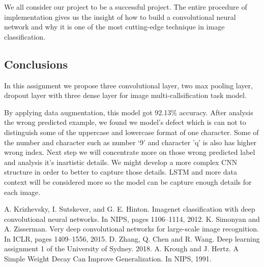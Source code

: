 \documentclass[twoside,twocolumn,10.8pt]{article}
\begin{document}
\noindent We all consider our project to be a successful project. The entire procedure of implementation gives us the insight of how to build a convolutional neural network and why it is one of the most cutting-edge technique in image classification.

\subsection{Conclusions}
\noindent In this assignment we propose three convolutional layer, two max pooling layer, dropout layer with three dense layer for image multi-callsification task model.

\noindent By applying data augmentation, this model got 92.13\% accuracy. After analysis the wrong predicted example, we found we model’s defect which is can not to distinguish some of the uppercase and lowercase format of one character. Some of the number and character such as number ‘9’ and character ’q’ is also has higher wrong index. Next step we will concentrate more on those wrong predicted label and analysis it’s inartistic details. We might develop a more complex CNN structure in order to better to capture those details. LSTM and more data context will be considered more so the model can be capture enough details for each image.













\begin{thebibliography}{99} %

A. Krizhevsky, I. Sutskever, and G. E. Hinton. Imagenet classification with deep convolutional neural networks. In NIPS, pages 1106–1114, 2012.
K. Simonyan and A. Zisserman. Very deep convolutional networks for large-scale image recognition. In ICLR, pages 1409–1556, 2015.
D. Zhang, Q. Chen and R. Wang. Deep learning assignment 1 of the University of Sydney. 2018.
A. Krough and J. Hertz. A Simple Weight Decay Can Improve Generalization. In NIPS, 1991.
 
\end{thebibliography}

\end{document}
